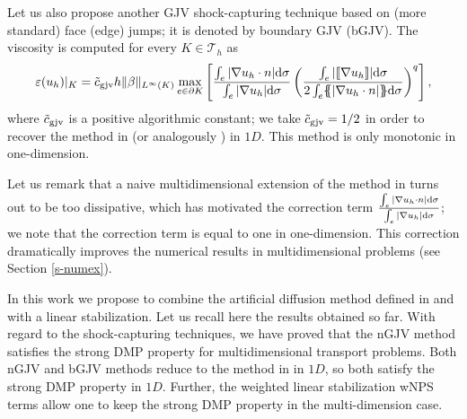 Let us also propose another GJV shock-capturing technique based on (more standard) face (edge) jumps; it is denoted by boundary GJV (bGJV). The viscosity is computed for every $K \in \mathcal{T}_h$ as 
\begin{align}\label{eq-gjvisc}
\varepsilon(u_h)|_K = \tilde c_{\rm gjv} h \|\beta\|_{L^\infty(K)} \max_{e \in \partial K}\left[\frac{\int_e |\nabla u_h \cdot n|{\rm d} \sigma}{\int_e |\nabla u_h| {\rm d} \sigma}\left(\frac{\int_e  | \lbrack\!\lbrack \nabla u_h \rbrack\!\rbrack|{\rm d} \sigma }{ 2 \int_e \{\! \!\{ |\nabla u_h \cdot n|\}\! \!\} {\rm d} \sigma}\right)^q\right],
\end{align}
where $\tilde c_{\rm gjv}$ is a positive algorithmic constant; we take $\tilde c_{\rm gjv} = 1/2$ in order to recover the method in  \cite{burman_nonlinear_2007} (or analogously ) in $1D$. This method is only monotonic in one-dimension. 

\begin{remark} Let us remark that a naive multidimensional extension of the method in \cite{burman_nonlinear_2007} turns out to be too dissipative, which has motivated the correction term  $\frac{\int_e |\nabla u_h \cdot n|{\rm d} \sigma}{\int_e |\nabla u_h| {\rm d} \sigma}$; we note that the correction term is equal to one in one-dimension. This correction dramatically improves the numerical results in multidimensional problems (see Section \ref{s-numex}).
\end{remark}


In this work we propose to combine the artificial diffusion method defined in  and  with a linear stabilization. Let us recall here the results obtained so far. With regard to the shock-capturing techniques, we have proved that the nGJV method satisfies the strong DMP property for multidimensional transport problems. Both nGJV and bGJV methods reduce to the method in \cite{burman_nonlinear_2007} in $1D$, so both satisfy the strong DMP property in $1D$. Further, the weighted linear stabilization wNPS terms allow one to keep the strong DMP property in the multi-dimension case. %

